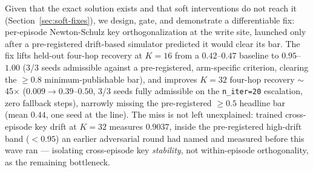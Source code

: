 Given that the exact solution exists and that soft interventions do not
reach it (Section~\ref{sec:soft-fixes}), we design, gate, and demonstrate a
differentiable fix: per-episode Newton-Schulz key orthogonalization at the
write site, launched only after a pre-registered drift-based simulator
predicted it would clear its bar. The fix lifts held-out four-hop recovery
at $K{=}16$ from a $0.42$--$0.47$ baseline to $0.95$--$1.00$ (3/3 seeds
admissible against a pre-registered, arm-specific criterion, clearing the
$\geq0.8$ minimum-publishable bar), and improves $K{=}32$ four-hop
recovery $\sim$45$\times$ ($0.009\to0.39$--$0.50$, 3/3 seeds fully
admissible on the \texttt{n\_iter=20} escalation, zero fallback steps),
narrowly missing the pre-registered $\geq0.5$ headline bar (mean $0.44$,
one seed at the line). The miss is not left unexplained: trained
cross-episode key drift at $K{=}32$ measures $0.9037$, inside the
pre-registered high-drift band ($<0.95$) an earlier adversarial round had
named and measured before this wave ran --- isolating cross-episode key
\emph{stability}, not within-episode orthogonality, as the remaining
bottleneck.

